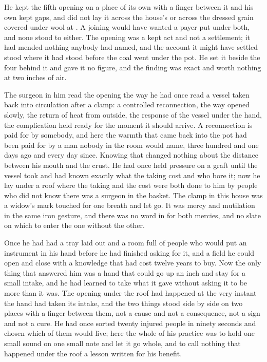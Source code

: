 He kept the fifth opening on a place of its own with a finger between it and his own kept gaps, and did not lay it across the house's  or across the dressed grain covered under wool at . A joining would have wanted a payer put under both, and none stood to either. The opening was a kept act and not a settlement; it had mended nothing anybody had named, and the account it might have settled stood where it had stood before the coal went under the pot. He set it beside the four behind it and gave it no figure, and the finding was exact and worth nothing at two inches of air.

\scenebreak

The surgeon in him read the opening the way he had once read a vessel taken back into circulation after a clamp: a controlled reconnection, the way opened slowly, the return of heat from outside, the response of the vessel under the hand, the complication held ready for the moment it should arrive. A reconnection is paid for by somebody, and here the warmth that came back into the pot had been paid for by a man nobody in the room would name, three hundred and one days ago and every day since. Knowing that changed nothing about the distance between his mouth and the crust. He had once held pressure on a graft until the vessel took and had known exactly what the taking cost and who bore it; now he lay under a roof where the taking and the cost were both done to him by people who did not know there was a surgeon in the basket. The clamp in this house was a widow's mark touched for one breath and let go. It was mercy and mutilation in the same iron gesture, and there was no word in  for both mercies, and no slate on which to enter the one without the other.

Once he had had a tray laid out and a room full of people who would put an instrument in his hand before he had finished asking for it, and a field he could open and close with a knowledge that had cost twelve years to buy. Now the only thing that answered him was a hand that could go up an inch and stay for a small intake, and he had learned to take what it gave without asking it to be more than it was. The opening under the roof had happened at the very instant the hand had taken its intake, and the two things stood side by side on two places with a finger between them, not a cause and not a consequence, not a sign and not a cure. He had once sorted twenty injured people in ninety seconds and chosen which of them would live; here the whole of his practice was to hold one small sound on one small note and let it go whole, and to call nothing that happened under the roof a lesson written for his benefit.

